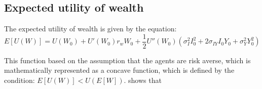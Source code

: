 \documentclass[
	12pt,				%
	twoside,			%
	a4paper,			%
	english,			%
	brazil			%
	]{abntex2}
\begin{document}
\begin{apendicesenv}

\partapendices

\chapter{Expected utility of wealth}

The expected utility of wealth is given by the equation:
\begin{equation}
  E[U(W)] = U(W_0) + U'(W_0)r_w W_0 + \frac{1}{2}U''(W_0)(\sigma_I^2 I_0^2 + 2\sigma_{IY} I_0 Y_0 + \sigma_Y^2 Y_0^2)
\end{equation}

This function based on the assumption that the agents are risk averse, which is mathematically represented as a concave function, which is defined by the condition: $E[U(W)] < U(E[W])$.  shows that 

\end{apendicesenv}

\begin{comment}
\begin{anexosenv}

\partanexos

\chapter{Morbi ultrices rutrum lorem.}
\lipsum[30]

\end{anexosenv}
\end{comment}
\printindex
\end{document}
